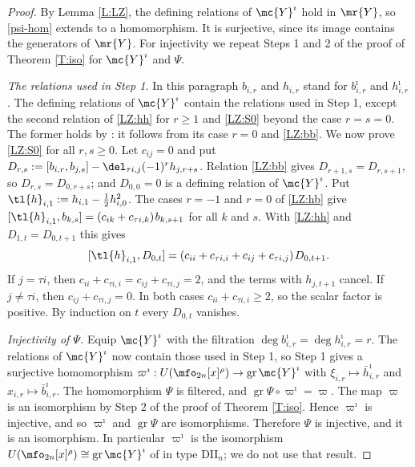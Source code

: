 \documentclass{amsart}
\numberwithin{equation}{section}
\theoremstyle{remark}
\DeclareMathOperator{\gr}{gr}
\renewcommand{\,}{\kern 0.1em} %
\begin{document}
\begin{proof}
%
By Lemma \ref{L:LZ}, the defining relations of $\mc{Y}^\imath$ hold in $\mr{Y}$, so
\eqref{psi-hom} extends to a homomorphism. It is surjective, since its image contains the
generators of $\mr{Y}$. For injectivity we repeat Steps 1 and 2 of the proof of Theorem
\ref{T:iso} for $\mc{Y}^\imath$ and $\Psi$.

\smallskip

{\it The relations used in Step 1.} In this paragraph $b_{i,r}$ and $h_{i,r}$ stand for
$b^\imath_{i,r}$ and $h^\imath_{i,r}$. The defining relations of $\mc{Y}^\imath$ contain the relations
used in Step 1, except the second relation of \eqref{LZ:hh} for $r\ge1$ and \eqref{LZ:S0} beyond the
case $r=s=0$. The former holds by \cite[(3.10)]{LZ25}: it follows from its case $r=0$ and
\eqref{LZ:bb}. We now prove \eqref{LZ:S0} for all $r,s\ge0$. Let $c_{ij}=0$ and put $D_{r,s} := [b_{i,r},b_{j,s}]-\del_{\tau i,j}(-1)^rh_{j,r+s}$.
Relation \eqref{LZ:bb} gives $D_{r+1,s} = D_{r,s+1}$, so $D_{r,s} = D_{0,r+s}$; and $D_{0,0}=0$ is
a defining relation of $\mc{Y}^\imath$. Put
$\tl{h}_{i,1} := h_{i,1}-\tfrac12h^2_{i,0}$. The cases $r=-1$ and $r=0$ of \eqref{LZ:hb} give
$[\tl{h}_{i,1},b_{k,s}] = (c_{ik}+c_{\tau i,k})\,b_{k,s+1}$ for all $k$ and $s$. With
\eqref{LZ:hh} and $D_{1,t}=D_{0,t+1}$ this gives
%
\[
[\tl{h}_{i,1},D_{0,t}] = (c_{ii}+c_{\tau i,i}+c_{ij}+c_{\tau i,j})\,D_{0,t+1} .
\]
%
If $j=\tau i$, then $c_{ii}+c_{\tau i,i} = c_{ij}+c_{\tau i,j} = 2$, and the terms with
$h_{j,t+1}$ cancel. If $j\ne\tau i$, then $c_{ij}+c_{\tau i,j}=0$. In both cases
$c_{ii}+c_{\tau i,i}\ge2$, so the scalar factor is positive. By induction on $t$
every $D_{0,t}$ vanishes.

\smallskip

{\it Injectivity of $\Psi$.} Equip $\mc{Y}^\imath$ with the filtration
$\deg b^\imath_{i,r} = \deg h^\imath_{i,r} = r$. The relations of $\mc{Y}^\imath$ now contain
those used in Step 1, so Step 1 gives a surjective homomorphism
$\varpi^\imath : U(\mfo_{2n}[x]^\rho)\to\gr\mc{Y}^\imath$ with $\xi_{i,r}\mapsto\bar{h}^\imath_{i,r}$
and $x_{i,r}\mapsto\bar{b}^\imath_{i,r}$. The homomorphism $\Psi$ is filtered, and
$\gr\Psi\circ\varpi^\imath = \varpi$. The map $\varpi$ is an isomorphism by Step 2 of the proof of
Theorem \ref{T:iso}. Hence $\varpi^\imath$ is injective, and so $\varpi^\imath$ and $\gr\Psi$ are
isomorphisms. Therefore $\Psi$ is injective, and it is an isomorphism. In particular
$\varpi^\imath$ is the isomorphism $U(\mfo_{2n}[x]^\rho)\cong\gr\mc{Y}^\imath$ of
\cite[Cor.~3.8]{LZ25} in type DII$_n$; we do not use that result.


\end{proof}
\end{document}
